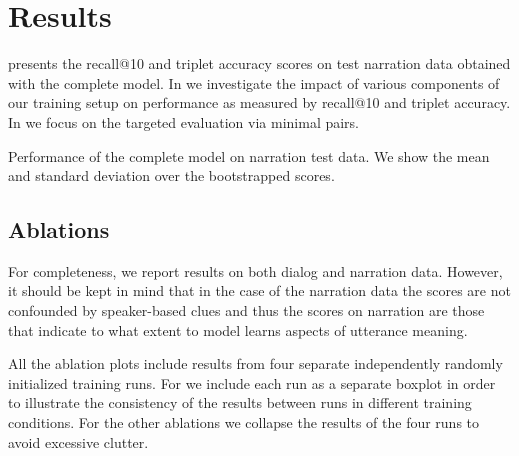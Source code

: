 \section{Results}
 presents the recall@10 and triplet accuracy
scores on test narration data obtained with the complete model.  In
 we investigate the impact of various components
of our training setup on performance as measured by recall@10 and
triplet accuracy.  In  we focus on the
targeted evaluation via minimal pairs.  

\label{sec:results}
\begin{table}[htb]
  
  \caption{Performance of the complete model on narration test
  	data. We show the mean and standard deviation over the
  	bootstrapped scores.}
  \label{tab:test_scores}
\end{table}


\subsection{Ablations}
\label{sec:ablations}
For completeness, we report results on both dialog and narration
data. However, it should be kept in mind that in the case of the
narration data the scores are not confounded by speaker-based clues
and thus the scores on narration are those that indicate to what extent to
model learns aspects of utterance meaning.

All the ablation plots include results from four separate
independently randomly initialized training runs. For
 we include each run as a separate boxplot in
order to illustrate the consistency of the results between runs in
different training conditions.  For the other ablations we collapse
the results of the four runs to avoid excessive clutter.

